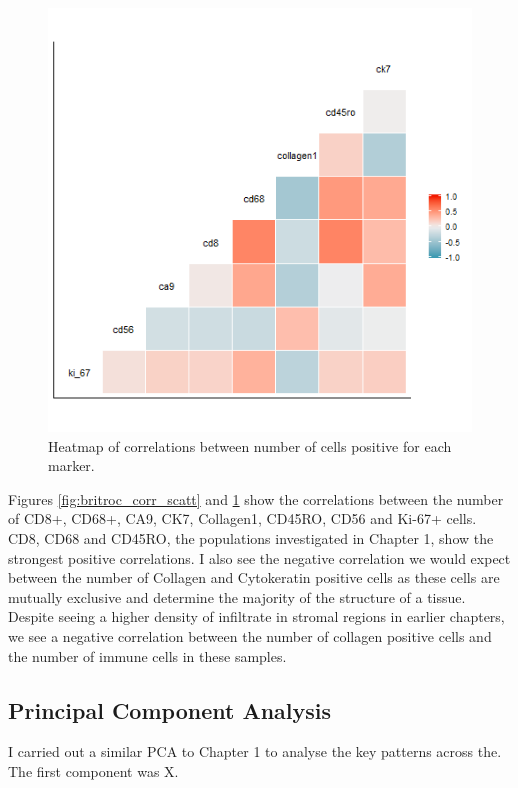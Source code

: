 \begin{figure}
    \centering
    \includegraphics[width=\textwidth]{Chapter4/figs/Britroc_cell_correlation.png}
    \caption{Heatmap of correlations between number of cells positive for each marker.}
    \label{fig:britroc_corr_heat}
\end{figure}

Figures \ref{fig:britroc_corr_scatt} and \ref{fig:britroc_corr_heat} show the correlations between the number of CD8+, CD68+, CA9, CK7, Collagen1, CD45RO, CD56 and Ki-67+ cells. CD8, CD68 and CD45RO, the populations investigated in Chapter 1, show the strongest positive correlations. I also see the negative correlation we would expect between the number of Collagen and Cytokeratin positive cells as these cells are mutually exclusive and determine the majority of the structure of a tissue. Despite seeing a higher density of infiltrate in stromal regions in earlier chapters, we see a negative correlation between the number of collagen positive cells and the number of immune cells in these samples.

\subsection{Principal Component Analysis}
I carried out a similar PCA to Chapter 1 to analyse the key patterns across the. The first component was X.

